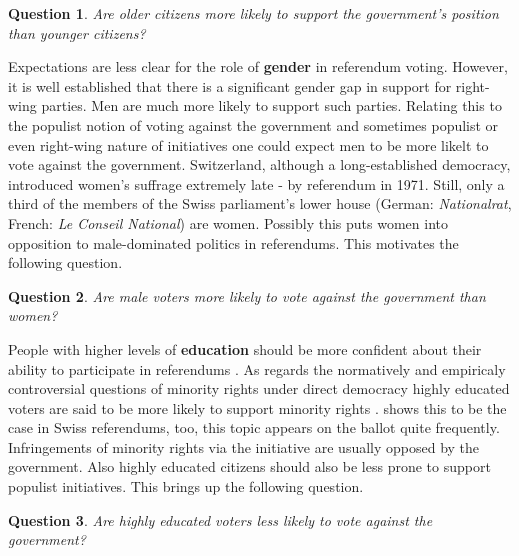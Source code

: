 \documentclass[11pt,a4paper]{article}\usepackage[]{graphicx}\usepackage[]{color}
\newtheorem{question}{Question}
\begin{document}
     \begin{question}
      \begin{minipage}[t]{4 in}
    	Are older citizens more likely to support the government's position than younger citizens?
      \end{minipage}
     \end{question}
    
    Expectations are less clear for the role of \textbf{gender} in referendum voting.  However, it is well established that there is a significant gender gap in support for right-wing parties. Men are much more likely to support such parties. Relating this to the populist notion of voting against the government and sometimes populist or even right-wing nature of initiatives one could expect men to be more likelt to vote against the government. Switzerland, although a long-established democracy, introduced women's suffrage extremely late - by referendum in 1971. Still, only a third of the members of the Swiss parliament's lower house (German: \textit{Nationalrat}, French: \textit{Le Conseil National}) are women. Possibly this puts women into opposition to male-dominated politics in referendums. This motivates the following question.
    
    \begin{question}
      \begin{minipage}[t]{4 in}
	    Are male voters more likely to vote against the government than women?
      \end{minipage}
    \end{question}
    
    
    People with higher levels of \textbf{education} should be more confident about their ability to participate in referendums \citep{collingwood_levels_2012}. 
    As regards the normatively and empiricaly controversial questions of minority rights under direct democracy highly educated voters are said to be more likely to support minority rights \citep{bowler_demanding_1998,anderson_why_2010}. \citep{vatter_who_2014} shows this to be the case in Swiss referendums, too, this topic appears on the ballot quite frequently. Infringements of minority rights via the initiative are usually opposed by the government. Also highly educated citizens should also be less prone to support populist initiatives. This brings up the following question. 
    
     \begin{question}
     	\begin{minipage}[t]{4 in}
    	Are highly educated voters less likely to vote against the government?
    	\end{minipage}
     \end{question}
    
\end{document}
